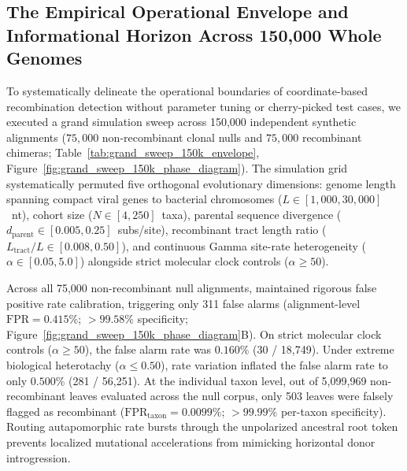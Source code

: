 \subsection{The Empirical Operational Envelope and Informational Horizon Across 150,000 Whole Genomes}
\label{subsec:sim_grand_sweep}

To systematically delineate the operational boundaries of coordinate-based recombination detection without parameter tuning or cherry-picked test cases, we executed a grand simulation sweep across 150,000 independent synthetic alignments ($75{,}000$ non-recombinant clonal nulls and $75{,}000$ recombinant chimeras; Table~\ref{tab:grand_sweep_150k_envelope}, Figure~\ref{fig:grand_sweep_150k_phase_diagram}).
The simulation grid systematically permuted five orthogonal evolutionary dimensions: genome length spanning compact viral genes to bacterial chromosomes ($L \in [1{,}000, 30{,}000]$~nt), cohort size ($N \in [4, 250]$~taxa), parental sequence divergence ($d_{\mathrm{parent}} \in [0.005, 0.25]$~subs/site), recombinant tract length ratio ($L_{\mathrm{tract}} / L \in [0.008, 0.50]$), and continuous Gamma site-rate heterogeneity ($\alpha \in [0.05, 5.0]$) alongside strict molecular clock controls ($\alpha \ge 50$).



Across all 75,000 non-recombinant null alignments, \RhizAeon maintained rigorous false positive rate calibration, triggering only 311 false alarms (alignment-level $\text{FPR} = 0.415\%$; $>99.58\%$ specificity; Figure~\ref{fig:grand_sweep_150k_phase_diagram}B).
On strict molecular clock controls ($\alpha \ge 50$), the false alarm rate was $0.160\%$ (30 / 18,749).
Under extreme biological heterotachy ($\alpha \le 0.50$), rate variation inflated the false alarm rate to only $0.500\%$ (281 / 56,251).
At the individual taxon level, out of 5,099,969 non-recombinant leaves evaluated across the null corpus, only 503 leaves were falsely flagged as recombinant ($\text{FPR}_{\text{taxon}} = 0.0099\%$; $>99.99\%$ per-taxon specificity).
Routing autapomorphic rate bursts through the unpolarized ancestral root token prevents localized mutational accelerations from mimicking horizontal donor introgression.

